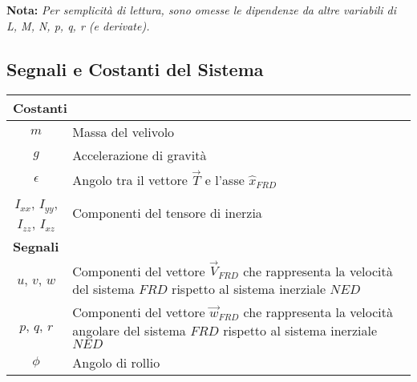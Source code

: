 \textbf{Nota:} \textit{Per semplicità di lettura, sono omesse le dipendenze da altre variabili di L, M, N, p, q, r (e derivate).}

\subsection{Segnali e Costanti del Sistema}

\renewcommand{\arraystretch}{1.2}
\begin{table}[H]
    \begin{tabularx}{\textwidth}{|c|X|}
        \hline
        \multicolumn{2}{|l|}{\textbf{Costanti}}                                                                                                                                    \\
        \hline
        $m$                                    & Massa del velivolo                                                                                                                \\
        $g$                                    & Accelerazione di gravità                                                                                                          \\
        $\epsilon$                             & Angolo tra il vettore $\vec{T}$ e l'asse $\hat{x}_{FRD}$                                                                          \\
        $I_{xx}$, $I_{yy}$, $I_{zz}$, $I_{xz}$ & Componenti del tensore di inerzia                                                                                                 \\
        \hline
        \multicolumn{2}{|l|}{\textbf{Segnali}}                                                                                                                                     \\
        \hline
        $u$, $v$, $w$                          & Componenti del vettore $\vec{V}_{FRD}$ che rappresenta la velocità del sistema $FRD$ rispetto al sistema inerziale $NED$          \\
        $p$, $q$, $r$                          & Componenti del vettore $\vec{w}_{FRD}$ che rappresenta la velocità angolare del sistema $FRD$ rispetto al sistema inerziale $NED$ \\
        $\phi$                                 & Angolo di rollio                                                                                                                  \\

\end{tabularx}
\end{table}
